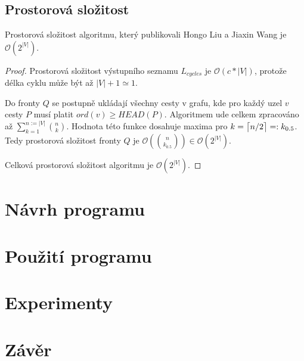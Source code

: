     \section{Prostorová složitost}
        \begin{theorem}
            Prostorová složitost algoritmu, který publikovali Hongo Liu a Jiaxin Wang je $\mathcal{O}(2^{|V|})$.
        \end{theorem}

        \begin{proof}
            Prostorová složitost výstupního seznamu $L_{cycles}$ je $\mathcal{O}(c * |V|)$, protože délka cyklu může být až $|V| + 1 \simeq 1$.

            Do fronty $Q$ se postupně ukládají všechny cesty v grafu, kde pro každý uzel $v$ cesty $P$ musí platit $ord(v) \geq HEAD(P)$. Algoritmem ude celkem zpracováno až $\sum_{k=1}^{n:= |V|} {n \choose k}$. Hodnota této funkce dosahuje maxima pro $k = \ceil[\big]{n/2} =: k_{0.5}$. Tedy prostorová složitost fronty $Q$ je $\mathcal{O}({n \choose k_{0.5}}) \in \mathcal{O}(2^{|V|})$.

            Celková prostorová složitost algoritmu je $\mathcal{O}(2^{|V|})$.
        \end{proof}



\chapter{Návrh programu}
    \label{chapter:Design}
    \lipsum

\chapter{Použití programu}
    \label{chapter:Help}
    \lipsum

\chapter{Experimenty}
    \label{chapter:Experiments}
    \lipsum

\chapter{Závěr}
    \label{chapter:Conclusion}
    \lipsum[2]
